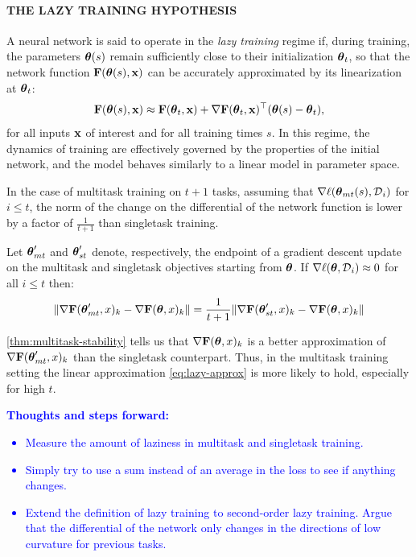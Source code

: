 \documentclass{article} %
\begin{document}
\paragraph{THE LAZY TRAINING HYPOTHESIS}
\begin{defn}
\label{def:lazy-training}
A neural network is said to operate in the \emph{lazy training} regime if, during training, the parameters \(\mbox{$\mbox{$\boldsymbol{\theta}$}$}(s)\) remain sufficiently close to their initialization \(\mbox{$\mbox{$\boldsymbol{\theta}$}$}_t\), so that the network function \(\mbox{$\mbox{$\mathbf{F}$}$}(\mbox{$\mbox{$\boldsymbol{\theta}$}$}(s), \mbox{$\mbox{$\mathbf{x}$}$})\) can be accurately approximated by its linearization at \(\mbox{$\mbox{$\boldsymbol{\theta}$}$}_t\):
\begin{equation}
\label{eq:lazy-approx}
\mbox{$\mbox{$\mathbf{F}$}$}(\mbox{$\mbox{$\boldsymbol{\theta}$}$}(s), \mbox{$\mbox{$\mathbf{x}$}$}) \approx \mbox{$\mbox{$\mathbf{F}$}$}(\mbox{$\mbox{$\boldsymbol{\theta}$}$}_t, \mbox{$\mbox{$\mathbf{x}$}$}) + \nabla\mbox{$\mbox{$\mathbf{F}$}$}(\mbox{$\mbox{$\boldsymbol{\theta}$}$}_t, \mbox{$\mbox{$\mathbf{x}$}$})^\top (\mbox{$\mbox{$\boldsymbol{\theta}$}$}(s) - \mbox{$\mbox{$\boldsymbol{\theta}$}$}_t),
\end{equation}
for all inputs \(\mbox{$\mbox{$\mathbf{x}$}$}\) of interest and for all training times \(s\). In this regime, the dynamics of training are effectively governed by the properties of the initial network, and the model behaves similarly to a linear model in parameter space.
\end{defn}

In the case of multitask training on $t+1$ tasks, assuming that $\nabla\ell(\mbox{$\mbox{$\boldsymbol{\theta}$}$}_{mt}(s), \mbox{${\cal D}$}_i)$ for $i\le t$, the norm of the change on the differential of the network function is lower by a factor of $\frac{1}{t+1}$ than singletask training. 
\begin{thm}
\label{thm:multitask-stability}
Let $\mbox{$\mbox{$\boldsymbol{\theta}$}$}'_{mt}$ and $\mbox{$\mbox{$\boldsymbol{\theta}$}$}'_{st}$ denote, respectively, the endpoint of a gradient descent update on the multitask and singletask objectives starting from $\mbox{$\mbox{$\boldsymbol{\theta}$}$}$. 
If $\nabla\ell(\mbox{$\mbox{$\boldsymbol{\theta}$}$}, \mbox{${\cal D}$}_i) \approx 0$ for all $i\le t$ then:
    \begin{equation}
        \|\nabla\mbox{$\mbox{$\mathbf{F}$}$}(\mbox{$\mbox{$\boldsymbol{\theta}$}$}_{mt}', x)_k - \nabla\mbox{$\mbox{$\mathbf{F}$}$}(\mbox{$\mbox{$\boldsymbol{\theta}$}$}, x)_k\| = \frac{1}{t+1}\|\nabla\mbox{$\mbox{$\mathbf{F}$}$}(\mbox{$\mbox{$\boldsymbol{\theta}$}$}_{st}', x)_k - \nabla\mbox{$\mbox{$\mathbf{F}$}$}(\mbox{$\mbox{$\boldsymbol{\theta}$}$}, x)_k\| 
    \end{equation}
\end{thm}
\cref{thm:multitask-stability} tells us that $\nabla\mbox{$\mbox{$\mathbf{F}$}$}(\mbox{$\mbox{$\boldsymbol{\theta}$}$}, x)_k$ is a better approximation of $\nabla\mbox{$\mbox{$\mathbf{F}$}$}(\mbox{$\mbox{$\boldsymbol{\theta}$}$}_{mt}', x)_k$ than the singletask counterpart. Thus, in the multitask training setting the linear approximation \cref{eq:lazy-approx} is more likely to hold, especially for high $t$. 

\textcolor{blue}{
\textbf{Thoughts and steps forward:}
\begin{itemize}
    \item Measure the amount of laziness in multitask and singletask training. 
    \item Simply try to use a sum instead of an average in the loss to see if anything changes. 
    \item Extend the definition of lazy training to second-order lazy training. Argue that the differential of the network only changes in the directions of low curvature for previous tasks. 
\end{itemize}
}
\end{document}
